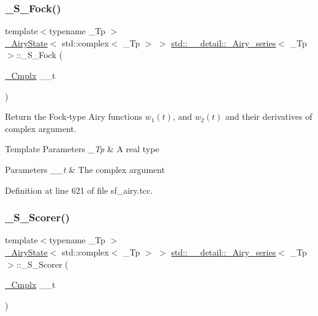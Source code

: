 \subsubsection{\texorpdfstring{\+\_\+\+S\+\_\+\+Fock()}{\_S\_Fock()}}
{\footnotesize\ttfamily template$<$typename \+\_\+\+Tp $>$ \\
\hyperlink{structstd_1_1____detail_1_1__AiryState}{\+\_\+\+Airy\+State}$<$ std\+::complex$<$ \+\_\+\+Tp $>$ $>$ \hyperlink{classstd_1_1____detail_1_1__Airy__series}{std\+::\+\_\+\+\_\+detail\+::\+\_\+\+Airy\+\_\+series}$<$ \+\_\+\+Tp $>$\+::\+\_\+\+S\+\_\+\+Fock (\begin{DoxyParamCaption}\item[{\hyperlink{classstd_1_1____detail_1_1__Airy__series_ab41161caa54609f4735987fbaed41d9d}{\+\_\+\+Cmplx}}]{\+\_\+\+\_\+t }\end{DoxyParamCaption})\hspace{0.3cm}{\ttfamily [static]}}

Return the Fock-\/type Airy functions $ w_1(t) $, and $ w_2(t) $ and their derivatives of complex argument.


\begin{DoxyTemplParams}{Template Parameters}
{\em \+\_\+\+Tp} & A real type \\
\hline
\end{DoxyTemplParams}

\begin{DoxyParams}{Parameters}
{\em \+\_\+\+\_\+t} & The complex argument \\
\hline
\end{DoxyParams}


Definition at line 621 of file sf\+\_\+airy.\+tcc.

\mbox{\label{classstd_1_1____detail_1_1__Airy__series_a71f68d64f0e202c4f98146f90c6b3298}} 
\subsubsection{\texorpdfstring{\+\_\+\+S\+\_\+\+Scorer()}{\_S\_Scorer()}}
{\footnotesize\ttfamily template$<$typename \+\_\+\+Tp $>$ \\
\hyperlink{structstd_1_1____detail_1_1__AiryState}{\+\_\+\+Airy\+State}$<$ std\+::complex$<$ \+\_\+\+Tp $>$ $>$ \hyperlink{classstd_1_1____detail_1_1__Airy__series}{std\+::\+\_\+\+\_\+detail\+::\+\_\+\+Airy\+\_\+series}$<$ \+\_\+\+Tp $>$\+::\+\_\+\+S\+\_\+\+Scorer (\begin{DoxyParamCaption}\item[{\hyperlink{classstd_1_1____detail_1_1__Airy__series_ab41161caa54609f4735987fbaed41d9d}{\+\_\+\+Cmplx}}]{\+\_\+\+\_\+t }\end{DoxyParamCaption})\hspace{0.3cm}{\ttfamily [static]}}

